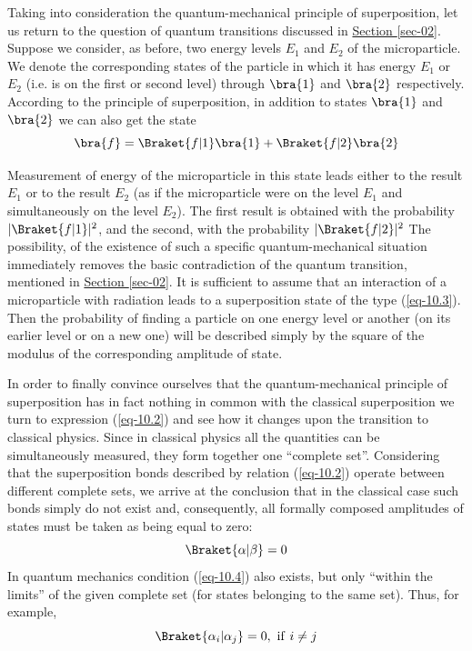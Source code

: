 \documentclass[a4paper,sfsidenotes,colorlinks=true]{tufte-book}
\numberwithin{equation}{section}
\numberwithin{figure}{section}
\begin{document}
Taking into consideration the quantum-mechanical principle of
superposition, let us return to the question of quantum transitions
discussed in \hyperref[sec-02]{Section \ref{sec-02}}. Suppose we
consider, as before, two energy levels $E_{1}$ and $E_{2}$ of the
microparticle. We denote the corresponding states of the particle in
which it has energy $E_{1}$ or $E_{2}$ (i.e. is on the first or second
level) through $\bra{1}$ and $\bra{2}$ respectively. According to the
principle of superposition, in addition to states $\bra{1}$ and $\bra{2}$ we can
also get the state
\begin{equation}
\bra{f} = \Braket{f|1} \bra{1} + \Braket{f|2} \bra{2}
\label{eq-10.3} 
\end{equation}

Measurement of energy of the microparticle in this state leads either
to the result $E_{1}$ or to the result $E_{2}$ (as if the
microparticle were on the level $E_{1}$ and simultaneously on the
level $E_{2}$). The first result is obtained with the probability
$|\Braket{f|1}|^{2}$, and the second, with the probability
$|\Braket{f|2}|^{2}$ The possibility, of the existence of such a
specific quantum-mechanical situation immediately removes the basic
contradiction of the quantum transition, mentioned in
\hyperref[sec-02]{Section \ref{sec-02}}. It is sufficient to assume
that an interaction of a microparticle with radiation leads to a
superposition state of the type (\ref{eq-10.3}). Then the probability of
finding a particle on one energy level or another (on its earlier
level or on a new one) will be described simply by the square of the
modulus of the corresponding amplitude of state.



In  order to finally convince ourselves
that the quantum-mechanical principle of superposition has in fact
nothing in common with the classical superposition we turn to
expression (\ref{eq-10.2}) and see how it changes upon the transition to
classical physics. Since in classical physics all the quantities can
be simultaneously measured, they form together one ``complete
set''. Considering that the superposition bonds described by relation
(\ref{eq-10.2}) operate between different complete sets, we arrive at the
conclusion that in the classical case such bonds simply do not exist
and, consequently, all formally composed amplitudes of states must be
taken as being equal to zero:
\begin{equation}
\Braket{\alpha | \beta} = 0 
\label{eq-10.4} 
\end{equation}
In quantum mechanics condition (\ref{eq-10.4}) also exists, but only
``within the limits'' of the given complete set (for states belonging to
the same set). Thus, for example,
\begin{equation}
\Braket{\alpha_{i} | \alpha_{j}} = 0, \,\, \mathrm{if} \,\, i \ne j
\label{eq-10.5} 
\end{equation}
\end{document}
